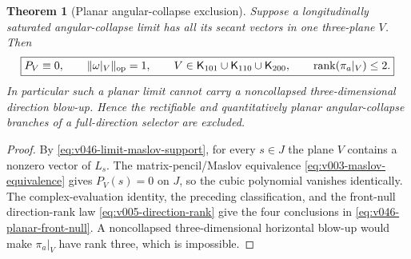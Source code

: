 \documentclass[10pt]{article}
\newtheorem{theorem}{Theorem}[section]
\newcommand{\rank}{\operatorname{rank}}
\begin{document}
\begin{theorem}[Planar angular-collapse exclusion]
\label{thm:v046-planar-angular-exclusion}
Suppose a longitudinally saturated angular-collapse limit has all its secant vectors in one
three-plane \(V\).  Then
\begin{equation}
\label{eq:v046-planar-front-null}
\boxed{
P_V\equiv0,
\qquad
\|\omega|_V\|_{\rm op}=1,
\qquad
V\in
\mathsf K_{101}\cup\mathsf K_{110}\cup\mathsf K_{200},
\qquad
\rank(\pi_a|_V)\le2.
}
\end{equation}
In particular such a planar limit cannot carry a noncollapsed three-dimensional direction
blow-up.  Hence the rectifiable and quantitatively planar angular-collapse branches of a
full-direction selector are excluded.
\end{theorem}

\begin{proof}
By \eqref{eq:v046-limit-maslov-support}, for every \(s\in J\) the plane \(V\) contains a nonzero
vector of \(L_s\).  The matrix-pencil/Maslov equivalence
\eqref{eq:v003-maslov-equivalence} gives \(P_V(s)=0\) on \(J\), so the cubic polynomial vanishes
identically.  The complex-evaluation identity, the preceding classification, and the
front-null direction-rank law \eqref{eq:v005-direction-rank} give the four conclusions in
\eqref{eq:v046-planar-front-null}.  A noncollapsed three-dimensional horizontal blow-up would make
\(\pi_a|_V\) have rank three, which is impossible.
\end{proof}
\end{document}
